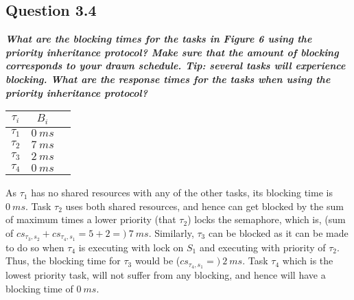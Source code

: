 \documentclass[oneside,a4paper]{article}
\begin{document}
\subsection*{\normalsize{Question 3.4}}
\textit{\textbf{What are the blocking times for the tasks in Figure 6 using the priority inheritance protocol? Make sure that the amount of blocking corresponds to your drawn schedule. Tip: several tasks will experience blocking. What are the response times for the tasks when using the priority inheritance protocol?}}\par
\begin{center}
\begin{tabular}{| c | c | l |}
\hline
\textbf{$\tau_i$} & \textbf{$B_i$} \\
\hline
$\tau_1$ & $0\ ms$ \\
$\tau_2$ & $7\ ms$ \\
$\tau_3$ & $2\ ms$ \\
$\tau_4$ & $0\ ms$ \\
\hline
\end{tabular}
\end{center}\par
As $\tau_1$ has no shared resources with any of the other tasks, its blocking time is $0\ ms$. Task $\tau_2$ uses both shared resources, and hence can get blocked by the sum of maximum times a lower priority (that $\tau_2$) locks the semaphore, which is, (sum of $cs_{\tau_3 , s_2} + cs_{\tau_4,s_1} = 5 + 2 =)\ 7\ ms$. Similarly, $\tau_3$ can be blocked as it can be made to do so when $\tau_4$ is executing with lock on $S_1$ and executing with priority of $\tau_2$. Thus, the blocking time for $\tau_3$ would be ($cs_{\tau_4,s_1} =)\ 2\ ms$. Task $\tau_4$ which is the lowest priority task, will not suffer from any blocking, and hence will have a blocking time of $0\ ms$.
\pagebreak
\end{document}
